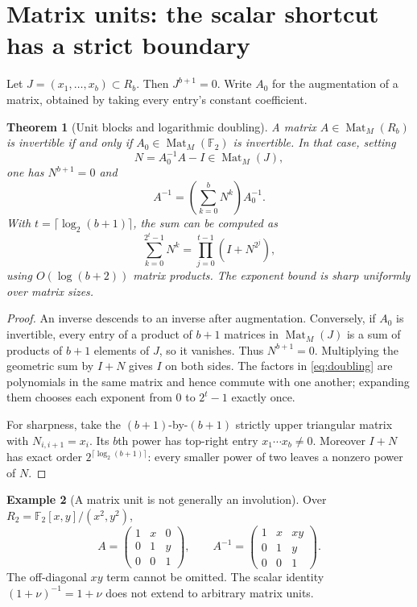 \documentclass[11pt]{article}
\newtheorem{theorem}{Theorem}[section]
\theoremstyle{definition}\newtheorem{definition}[theorem]{Definition}
\newtheorem{example}[theorem]{Example}
\theoremstyle{remark}\newtheorem{remark}[theorem]{Remark}
\newcommand{\F}{\mathbb F_2}
\newcommand{\Mat}{\operatorname{Mat}}
\begin{document}
\section{Matrix units: the scalar shortcut has a strict boundary}
\label{sec:units}
Let $J=(x_1,\ldots,x_b)\subset R_b$. Then $J^{b+1}=0$. Write $A_0$ for the augmentation of a matrix, obtained by taking every entry's constant coefficient.

\begin{theorem}[Unit blocks and logarithmic doubling]\label{thm:unit}
A matrix $A\in\Mat_M(R_b)$ is invertible if and only if $A_0\in\Mat_M(\F)$ is invertible. In that case, setting
\[
 N=A_0^{-1}A-I\in\Mat_M(J),
\]
one has $N^{b+1}=0$ and
\begin{equation}\label{eq:inverse}
 A^{-1}=\left(\sum_{k=0}^{b}N^k\right)A_0^{-1}.
\end{equation}
With $t=\lceil\log_2(b+1)\rceil$, the sum can be computed as
\begin{equation}\label{eq:doubling}
 \sum_{k=0}^{2^t-1}N^k=\prod_{j=0}^{t-1}(I+N^{2^j}),
\end{equation}
using $O(\log(b+2))$ matrix products. The exponent bound is sharp uniformly over matrix sizes.
\end{theorem}
\begin{proof}
An inverse descends to an inverse after augmentation. Conversely, if $A_0$ is invertible, every entry of a product of $b+1$ matrices in $\Mat_M(J)$ is a sum of products of $b+1$ elements of $J$, so it vanishes. Thus $N^{b+1}=0$. Multiplying the geometric sum by $I+N$ gives $I$ on both sides. The factors in \eqref{eq:doubling} are polynomials in the same matrix and hence commute with one another; expanding them chooses each exponent from $0$ to $2^t-1$ exactly once.

For sharpness, take the $(b+1)$-by-$(b+1)$ strictly upper triangular matrix with $N_{i,i+1}=x_i$. Its $b$th power has top-right entry $x_1\cdots x_b\ne0$. Moreover $I+N$ has exact order $2^{\lceil\log_2(b+1)\rceil}$: every smaller power of two leaves a nonzero power of $N$.
\end{proof}

\begin{example}[A matrix unit is not generally an involution]\label{ex:noninvolution}
Over $R_2=\F[x,y]/(x^2,y^2)$,
\[
 A=\begin{pmatrix}1&x&0\\0&1&y\\0&0&1\end{pmatrix},\qquad
 A^{-1}=\begin{pmatrix}1&x&xy\\0&1&y\\0&0&1\end{pmatrix}.
\]
The off-diagonal $xy$ term cannot be omitted. The scalar identity $(1+\nu)^{-1}=1+\nu$ does not extend to arbitrary matrix units.
\end{example}
\end{document}
